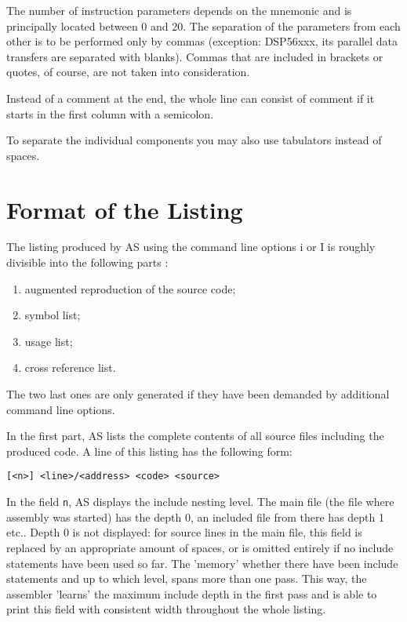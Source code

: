 \documentclass[12pt,twoside]{report}
\newcommand{\tty}[1]{{\tt #1}}
\newcommand{\asname}{{AS}}
\begin{document}
The number of instruction parameters depends on the mnemonic and is
principally located between 0 and 20.  The separation of the parameters
from each other is to be performed only by commas (exception: DSP56xxx,
its parallel data transfers are separated with blanks).  Commas that
are included in brackets or quotes, of course, are not taken into
consideration.

Instead of a comment at the end, the whole line can consist of
comment if it starts in the first column with a semicolon.

To separate the individual components you may also use tabulators
instead of spaces.


\section{Format of the Listing}
\label{SectListing}

The listing produced by \asname{} using the command line options i or I is
roughly divisible into the following parts :
\begin{enumerate}
\item{augmented reproduction of the source code;}
\item{symbol list;}
\item{usage list;}
\item{cross reference list.}
\end{enumerate}
The two last ones are only generated if they have been demanded by
additional command line options.

In the first part, \asname{} lists the complete contents of all source files
including the produced code.  A line of this listing has the following
form:
\begin{verbatim}
[<n>] <line>/<address> <code> <source>
\end{verbatim}
In the field \tty{n}, \asname{} displays the include nesting level.  The main file
(the file where assembly was started) has the depth 0, an included
file from there has depth 1 etc..  Depth 0 is not displayed: for source lines
in the main file, this field is replaced by an appropriate amount of spaces,
or is omitted entirely if no include statements have been used so far.  The
'memory' whether there have been include statements and up to which level,
spans more than one pass.  This way, the assembler 'learns' the maximum
include depth in the first pass and is able to print this field with
consistent width throughout the whole listing.
\end{document}
